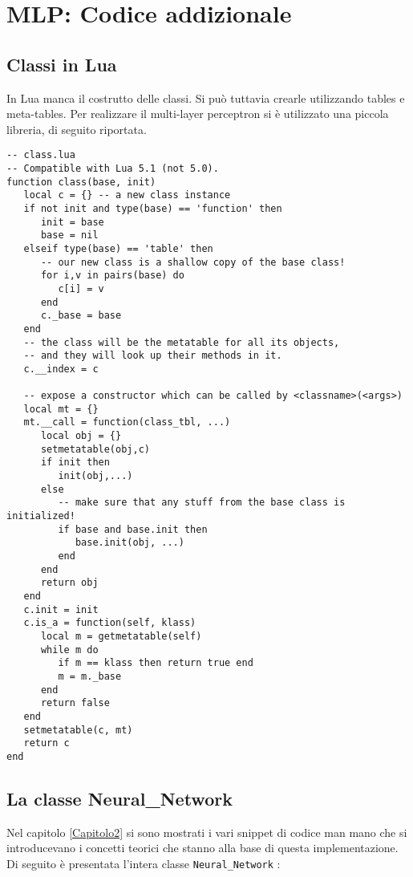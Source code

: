 
\chapter{MLP: Codice addizionale} %

\label{AppendixA} %

\section{Classi in Lua}
In Lua manca il costrutto delle classi. Si può tuttavia crearle utilizzando tables e meta-tables. Per realizzare il multi-layer perceptron si è utilizzato una piccola libreria, di seguito riportata. 

\begin{lstlisting}[language={[5.2]Lua}]
-- class.lua
-- Compatible with Lua 5.1 (not 5.0).
function class(base, init)
   local c = {} -- a new class instance
   if not init and type(base) == 'function' then
      init = base
      base = nil
   elseif type(base) == 'table' then
      -- our new class is a shallow copy of the base class!
      for i,v in pairs(base) do
         c[i] = v
      end
      c._base = base
   end
   -- the class will be the metatable for all its objects,
   -- and they will look up their methods in it.
   c.__index = c

   -- expose a constructor which can be called by <classname>(<args>)
   local mt = {}
   mt.__call = function(class_tbl, ...)
      local obj = {}
      setmetatable(obj,c)
      if init then
         init(obj,...)
      else
         -- make sure that any stuff from the base class is initialized!
         if base and base.init then
            base.init(obj, ...)
         end
      end
      return obj
   end
   c.init = init
   c.is_a = function(self, klass)
      local m = getmetatable(self)
      while m do
         if m == klass then return true end
         m = m._base
      end
      return false
   end
   setmetatable(c, mt)
   return c
end
\end{lstlisting}
\section{La classe Neural\_Network}
Nel capitolo \ref{Capitolo2} si sono mostrati i vari snippet di codice man mano che si introducevano i concetti teorici che stanno alla base di questa implementazione. Di seguito è presentata l'intera classe \texttt{Neural\_Network} :

